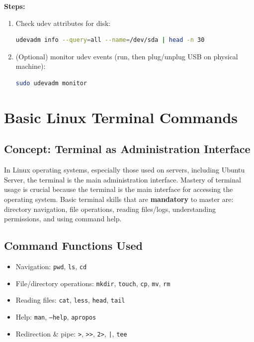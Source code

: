 \textbf{Steps:}
\begin{enumerate}
    \item Check udev attributes for disk:
\begin{lstlisting}[language=bash, caption={View udev attributes for disk}]
udevadm info --query=all --name=/dev/sda | head -n 30
\end{lstlisting}

    \item (Optional) monitor udev events (run, then plug/unplug USB on physical machine):
\begin{lstlisting}[language=bash, caption={Monitor udev events (optional)}]
sudo udevadm monitor
\end{lstlisting}
\end{enumerate}

\section{Basic Linux Terminal Commands}
\label{sec:basic-commands}

\subsection*{Concept: Terminal as Administration Interface}
In Linux operating systems, especially those used on servers, including Ubuntu Server, the terminal is the main administration interface. Mastery of terminal usage is crucial because the terminal is the main interface for accessing the operating system. Basic terminal skills that are \textbf{mandatory} to master are:
directory navigation, file operations, reading files/logs, understanding permissions, and using command help.

\subsection*{Command Functions Used}
\begin{itemize}
    \item Navigation: \texttt{pwd}, \texttt{ls}, \texttt{cd}
    \item File/directory operations: \texttt{mkdir}, \texttt{touch}, \texttt{cp}, \texttt{mv}, \texttt{rm}
    \item Reading files: \texttt{cat}, \texttt{less}, \texttt{head}, \texttt{tail}
    \item Help: \texttt{man}, \texttt{--help}, \texttt{apropos}
    \item Redirection \& pipe: \texttt{>}, \texttt{>>}, \texttt{2>}, \texttt{|}, \texttt{tee}
\end{itemize}

